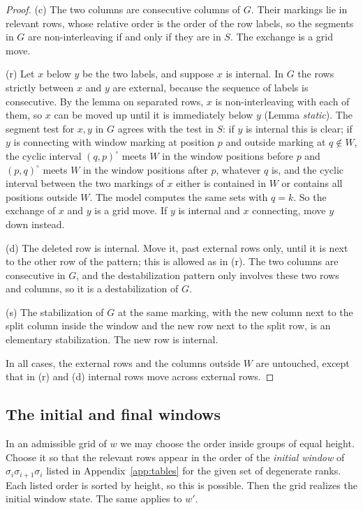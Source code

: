 \documentclass[11pt]{amsart}
\theoremstyle{definition}
\theoremstyle{remark}
\begin{document}
\begin{proof}
(c) The two columns are consecutive columns of $G$. Their markings lie in relevant rows, whose relative
order is the order of the row labels, so the segments in $G$ are non-interleaving if and only if they
are in $S$. The exchange is a grid move.

(r) Let $x$ below $y$ be the two labels, and suppose $x$ is internal. In $G$ the rows strictly between
$x$ and $y$ are external, because the sequence of labels is consecutive. By the lemma on separated rows,
$x$ is non-interleaving with each of them, so $x$ can be moved up until it is immediately below $y$
(Lemma \emph{static}). The segment test for $x,y$ in $G$ agrees with the test in $S$: if $y$ is internal
this is clear; if $y$ is connecting with window marking at position $p$ and outside marking at $q\notin
W$, the cyclic interval $(q,p)^\circ$ meets $W$ in the window positions before $p$ and
$(p,q)^\circ$ meets $W$ in the window positions after $p$, whatever $q$ is, and the cyclic interval
between the two markings of $x$ either is contained in $W$ or contains all positions outside $W$. The
model computes the same sets with $q=k$. So the exchange of $x$ and $y$ is a grid move. If $y$ is
internal and $x$ connecting, move $y$ down instead.

(d) The deleted row is internal. Move it, past external rows only, until it is next to the other row of
the pattern; this is allowed as in (r). The two columns are consecutive in $G$, and the destabilization
pattern only involves these two rows and columns, so it is a destabilization of $G$.

(s) The stabilization of $G$ at the same marking, with the new column next to the split column inside
the window and the new row next to the split row, is an elementary stabilization. The new row is
internal.

In all cases, the external rows and the columns outside $W$ are untouched, except that in (r) and (d)
internal rows move across external rows.
\end{proof}

\subsection{The initial and final windows}
In an admissible grid of $w$ we may choose the order inside groups of equal height. Choose it so that
the relevant rows appear in the order of the \emph{initial window} of $\sigma_i\sigma_{i+1}\sigma_i$
listed in Appendix~\ref{app:tables} for the given set of degenerate ranks. Each listed order is sorted by
height, so this is possible. Then the grid realizes the initial window state. The same applies to $w'$.
\end{document}
